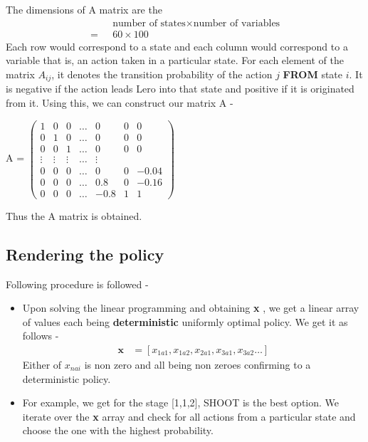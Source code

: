 \documentclass[11pt]{article}
\begin{document}
	The dimensions of A matrix are the 
	\begin{align*}
		& \text{number of states} \times \text{number of variables}  \\
		=\text{  }& 60 \times 100 
	\end{align*}
	Each row would correspond to a state and each column would correspond to a variable that is, an action taken in a particular state. 
	For each element of the matrix $A_{ij}$, it denotes the transition probability of the action $j$ \textbf{FROM} state $i$. It is negative
	if the action leads Lero into that state and positive if it is originated from it.
	Using this, we can construct our matrix A - 
	\begin{center}
		A =
	$ 
	\begin{pmatrix}
		1 & 0 & 0 &\ldots &0&0&0\\
		0 & 1 & 0 &\ldots &0&0&0\\
		0 & 0 & 1 &\ldots &0&0&0\\
		\vdots & \vdots & \vdots & \ldots & \vdots \\
		0 & 0 & 0 &\ldots &0&0&-0.04\\
		0 & 0 & 0 &\ldots &0.8&0&-0.16\\
		0 & 0 & 0 &\ldots &-0.8&1&1
	\end{pmatrix}		
		$
	\end{center}
		Thus the A matrix is obtained.
		\subsection{Rendering the policy}
		Following procedure is followed - 
		\begin{itemize}
	\item 		Upon solving the linear programming and obtaining \textbf{x} , we get a linear array of values each being \textbf{deterministic} uniformly
	optimal policy. We get it as follows - 
	\begin{align*}
		\textbf{x} &= [x_{1a1},x_{1a2},x_{2a1},x_{3a1},x_{3a2} \ldots ]
	\end{align*}
	Either of $x_{nai}$ is non zero and all being non zeroes confirming to a deterministic policy.
\item 			For example, we get for the stage [1,1,2], SHOOT is the best option. We iterate over the \textbf{x} array and check for all actions from a particular 
state and choose the one with the highest probability.

		\end{itemize}
\end{document}
